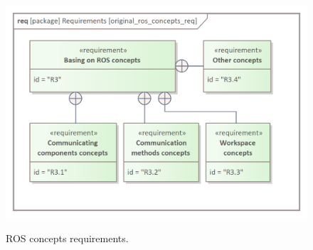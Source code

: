 \documentclass{ieeeaccess}
\begin{document}
	\begin{figure}[htb]
		\centering
		\begin{center}
			{\includegraphics[scale=0.7]{img/requirement_pkg/original_ros_concepts_req.png}}
		\end{center}
		\caption{ROS concepts requirements.} 
		\label{fig:ros_concepts_req}
	\end{figure}
	
\end{document}
